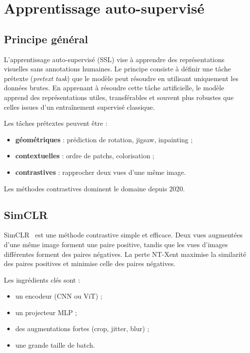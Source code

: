 \documentclass[12pt,a4paper]{report}
\begin{document}
	\section{Apprentissage auto-supervisé}
	
	\subsection{Principe général}
	
	L’apprentissage auto-supervisé (SSL) vise à apprendre des représentations visuelles sans annotations humaines. 
	Le principe consiste à définir une tâche prétexte (\emph{pretext task}) que le modèle peut résoudre en utilisant uniquement les données brutes. 
	En apprenant à résoudre cette tâche artificielle, le modèle apprend des représentations utiles, transférables et souvent plus robustes que celles issues d’un entraînement supervisé classique.
	
	Les tâches prétextes peuvent être :
	\begin{itemize}
		\item \textbf{géométriques} : prédiction de rotation, jigsaw, inpainting ;
		\item \textbf{contextuelles} : ordre de patchs, colorisation ;
		\item \textbf{contrastives} : rapprocher deux vues d’une même image.
	\end{itemize}
	
	Les méthodes contrastives dominent le domaine depuis 2020.
	
	\subsection{SimCLR}
	
	SimCLR~\cite{Chen2020} est une méthode contrastive simple et efficace.  
	Deux vues augmentées d’une même image forment une paire positive, tandis que les vues d’images différentes forment des paires négatives.  
	La perte NT-Xent maximise la similarité des paires positives et minimise celle des paires négatives.
	
	Les ingrédients clés sont :
	\begin{itemize}
		\item un encodeur (CNN ou ViT) ;
		\item un projecteur MLP ;
		\item des augmentations fortes (crop, jitter, blur) ;
		\item une grande taille de batch.
	\end{itemize}
	
\end{document}
